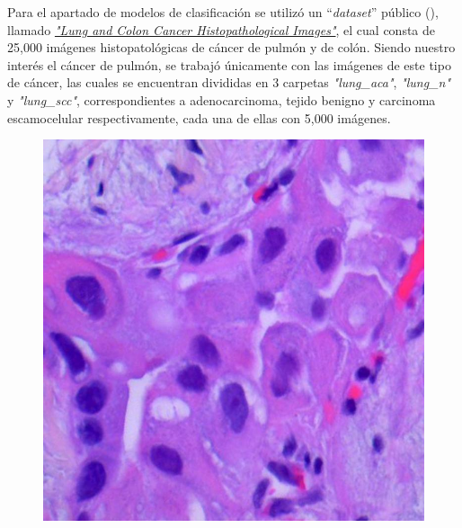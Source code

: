 Para el apartado de modelos de clasificación se utilizó un ``\textit{dataset}'' público ({\cite{500images}}), llamado \href{https://www.kaggle.com/datasets/andrewmvd/lung-and-colon-cancer-histopathological-images}{\textit{"Lung and Colon Cancer Histopathological Images"}}, el cual consta de 25,000 imágenes histopatológicas de cáncer de pulmón y de colón. Siendo nuestro interés el cáncer de pulmón, se trabajó únicamente con las imágenes de este tipo de cáncer, las cuales se encuentran divididas en 3 carpetas \textit{"lung\_aca"}, \textit{"lung\_n"} y \textit{"lung\_scc"}, correspondientes a adenocarcinoma, tejido benigno y carcinoma escamocelular respectivamente, cada una de ellas con 5,000 imágenes.

\begin{figure}[h!]
    \centering
    \begin{minipage}{0.3\textwidth} %
        \centering
        \includegraphics[width=\linewidth]{Francisco/Imagenes metodologia calisficacion/lungaca1.jpeg} %
    \end{minipage}
    \hspace{0.5cm} %
    \begin{minipage}{0.3\textwidth} %

\end{minipage}
\end{figure}
